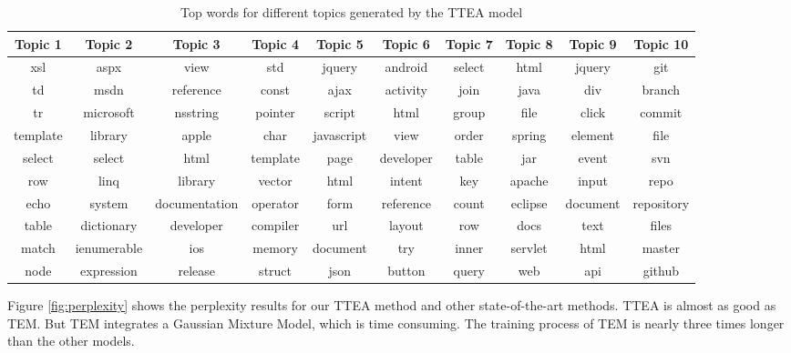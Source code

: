 {{{{{{{\begin{sidewaystable}
\caption{Top words for different topics generated by the TTEA model}
\label{tab:topwordsp}
\centering
\begin{tabular}{cccccccccc}
\hline
Topic 1& Topic 2& Topic 3& Topic 4 & Topic 5 & Topic 6& Topic 7 & Topic 8 &Topic 9 & Topic 10\\
\hline
xsl&aspx&view&std&jquery&android&select&html&jquery&git \\ 
td&msdn&reference&const&ajax&activity&join&java&div&branch \\ 
tr&microsoft&nsstring&pointer&script&html&group&file&click&commit \\ 
template&library&apple&char&javascript&view&order&spring&element&file \\ 
select&select&html&template&page&developer&table&jar&event&svn \\ 
row&linq&library&vector&html&intent&key&apache&input&repo \\ 
echo&system&documentation&operator&form&reference&count&eclipse&document&repository \\ 
table&dictionary&developer&compiler&url&layout&row&docs&text&files \\ 
match&ienumerable&ios&memory&document&try&inner&servlet&html&master \\ 
node&expression&release&struct&json&button&query&web&api&github \\ 
\hline
\end{tabular}
\end{sidewaystable}

Figure \ref{fig:perplexity} shows the perplexity results for our TTEA method and other state-of-the-art methods. 
TTEA is almost as good as TEM. But TEM integrates a Gaussian Mixture Model, which is time consuming. The training process of TEM is nearly three times longer than the other models.





}}}}}}}
